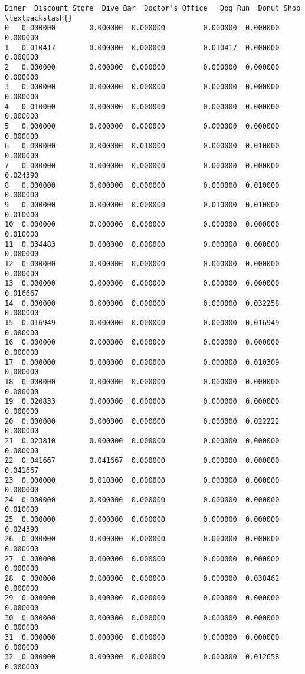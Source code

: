 \documentclass[11pt]{article}
\begin{document}
\begin{tcolorbox}[breakable, size=fbox, boxrule=.5pt, pad at break*=1mm, opacityfill=0]
\begin{Verbatim}[commandchars=\\\{\}]
       Diner  Discount Store  Dive Bar  Doctor's Office   Dog Run  Donut Shop  \textbackslash{}
0   0.000000        0.000000  0.000000         0.000000  0.000000    0.000000
1   0.010417        0.000000  0.000000         0.010417  0.000000    0.000000
2   0.000000        0.000000  0.000000         0.000000  0.000000    0.000000
3   0.000000        0.000000  0.000000         0.000000  0.000000    0.000000
4   0.010000        0.000000  0.000000         0.000000  0.000000    0.000000
5   0.000000        0.000000  0.000000         0.000000  0.000000    0.000000
6   0.000000        0.000000  0.010000         0.000000  0.010000    0.000000
7   0.000000        0.000000  0.000000         0.000000  0.000000    0.024390
8   0.000000        0.000000  0.000000         0.000000  0.010000    0.000000
9   0.000000        0.000000  0.000000         0.010000  0.010000    0.010000
10  0.000000        0.000000  0.000000         0.000000  0.000000    0.010000
11  0.034483        0.000000  0.000000         0.000000  0.000000    0.000000
12  0.000000        0.000000  0.000000         0.000000  0.000000    0.000000
13  0.000000        0.000000  0.000000         0.000000  0.000000    0.016667
14  0.000000        0.000000  0.000000         0.000000  0.032258    0.000000
15  0.016949        0.000000  0.000000         0.000000  0.016949    0.000000
16  0.000000        0.000000  0.000000         0.000000  0.000000    0.000000
17  0.000000        0.000000  0.000000         0.000000  0.010309    0.000000
18  0.000000        0.000000  0.000000         0.000000  0.000000    0.000000
19  0.020833        0.000000  0.000000         0.000000  0.000000    0.000000
20  0.000000        0.000000  0.000000         0.000000  0.022222    0.000000
21  0.023810        0.000000  0.000000         0.000000  0.000000    0.000000
22  0.041667        0.041667  0.000000         0.000000  0.000000    0.041667
23  0.000000        0.010000  0.000000         0.000000  0.000000    0.000000
24  0.000000        0.000000  0.000000         0.000000  0.000000    0.010000
25  0.000000        0.000000  0.000000         0.000000  0.000000    0.024390
26  0.000000        0.000000  0.000000         0.000000  0.000000    0.000000
27  0.000000        0.000000  0.000000         0.000000  0.000000    0.000000
28  0.000000        0.000000  0.000000         0.000000  0.038462    0.000000
29  0.000000        0.000000  0.000000         0.000000  0.000000    0.000000
30  0.000000        0.000000  0.000000         0.000000  0.000000    0.000000
31  0.000000        0.000000  0.000000         0.000000  0.000000    0.000000
32  0.000000        0.000000  0.000000         0.000000  0.012658    0.000000

\end{Verbatim}
\end{tcolorbox}
\end{document}
